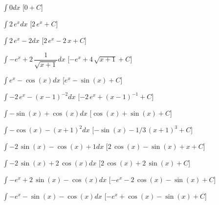 \begin{esercizio}\label{ese: 3}
 \begin{enumeratea}
\item \(\int 0 dx\) 
\hfill [\(0 + C\)]
\item \(\int 2\,{{e}^{x}} dx\) 
\hfill [\(2\,{{e}^{x}} + C\)]
\item \(\int 2\,{{e}^{x}}-2 dx\) 
\hfill [\(2\,{{e}^{x}}-2\,x + C\)]
\item \(\int -{{e}^{x}}+2\,{\dfrac {1}{\sqrt {x+1}}} dx\) 
\hfill [\(-{{e}^{x}}+4\,\sqrt {x+1} + C\)]
\item \(\int {{e}^{x}}-\cos \left( x \right)  dx\) 
\hfill [\({{e}^{x}}-\sin \left( x \right)  + C\)]
\item \(\int -2\,{{e}^{x}}- \left( x-1 \right) ^{-2} dx\) 
\hfill [\(-2\,{{e}^{x}}+ \left( x-1 \right) ^{-1} + C\)]
\item \(\int -\sin \left( x \right) +\cos \left( x \right)  dx\) 
\hfill [\(\cos \left( x \right) +\sin \left( x \right)  + C\)]
\item \(\int -\cos \left( x \right) - \left( x+1 \right) ^{2} dx\) 
\hfill [\(-\sin \left( x \right) -1/3\, \left( x+1 \right) ^{3} + C\)]
\item \(\int -2\,\sin \left( x \right) -\cos \left( x \right) +1 dx\) 
\hfill [\(2\,\cos \left( x \right) -\sin \left( x \right) +x + C\)]
\item \(\int -2\,\sin \left( x \right) +2\,\cos \left( x \right)  dx\) 
\hfill [\(2\,\cos \left( x \right) +2\,\sin \left( x \right)  + C\)]
\item \(\int -{{e}^{x}}+2\,\sin \left( x \right) -\cos \left( x \right)dx\) 
\hfill [\(-{{e}^{x}}-2\,\cos \left( x \right) -\sin \left( x \right) +C\)]
\item \(\int -{{e}^{x}}-\sin \left( x \right) -\cos \left( x \right)  dx\) 
\hfill [\(-{{e}^{x}}+\cos \left( x \right) -\sin \left( x \right)  + C\)]
 \end{enumeratea}
\end{esercizio}

\begin{comment}
 
\begin{esercizio}\label{ese:03.1}
 \begin{enumeratea}
 \end{enumeratea}
\end{esercizio}

\end{comment}

